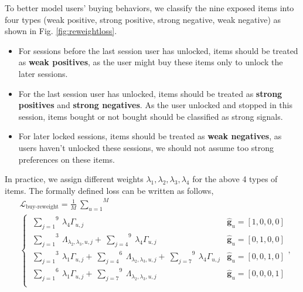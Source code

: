 To better model users' buying behaviors, we classify the nine exposed items into four types (weak positive, strong positive, strong negative, weak negative) as shown in Fig. \ref{fig:reweightloss}.
%
\begin{itemize}
    \item For sessions before the last session user has unlocked, items should be treated as \textbf{weak positives}, as the user might buy these items only to unlock the later sessions.
    \item For the last session user has unlocked, items should be treated as \textbf{strong positives} and \textbf{strong negatives}. As the user unlocked and stopped in this session, items bought or not bought should be classified as strong signals.
    \item For later locked sessions, items should be treated as \textbf{weak negatives}, as users haven't unlocked these sessions, we should not assume too strong preferences on these items.
\end{itemize}
In practice, we assign different weights $\lambda_1, \lambda_2, \lambda_3, \lambda_4$ for the above 4 types of items. The formally defined loss can be written as follows,
\small
\begin{equation}
\begin{aligned}
    &\mathcal{L}_{\text{buy-reweight}} = \frac{1}{M} ~\overset{M}{\underset{u=1}{\sum}} \\
        &\begin{cases}
        ~\overset{9}{\underset{j=1}{\sum}} ~\lambda_4 \Gamma_{u,j}
        & \mathbf{\hat{g}}_{u} = [1,0,0,0] \\
        ~\overset{3}{\underset{j=1}{\sum}} ~\Lambda_{\lambda_2,\lambda_3,u,j} + 
        ~\overset{9}{\underset{j=4}{\sum}} ~\lambda_4 \Gamma_{u,j}
        & \mathbf{\hat{g}}_{u} = [0,1,0,0] \\
        ~\overset{3}{\underset{j=1}{\sum}} ~\lambda_1 \Gamma_{u,j} + 
        ~\overset{6}{\underset{j=4}{\sum}} ~\Lambda_{\lambda_2,\lambda_3,u,j} + 
        ~\overset{9}{\underset{j=7}{\sum}} ~\lambda_4 \Gamma_{u,j}
        & \mathbf{\hat{g}}_{u} = [0,0,1,0] \\
        ~\overset{6}{\underset{j=1}{\sum}} ~\lambda_1 \Gamma_{u,j} + 
        ~\overset{9}{\underset{j=7}{\sum}} ~\Lambda_{\lambda_2,\lambda_3,u,j}
        & \mathbf{\hat{g}}_{u} = [0,0,0,1] \\
        \end{cases},
\end{aligned}
\end{equation}
